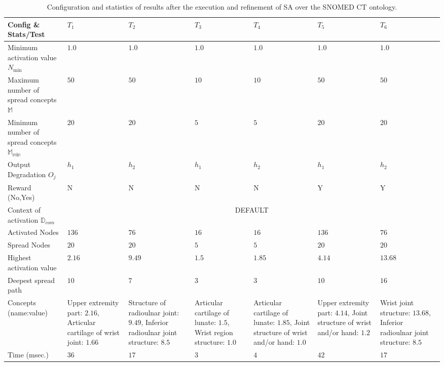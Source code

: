 \begin{table*}[!h]
\renewcommand{\arraystretch}{1.3}
\begin{center}
\begin{tabular}{|p{3cm}|p{1.5cm}|p{1.5cm}|p{1.5cm}|p{1.5cm}|p{1.5cm}|p{1.5cm}|}
\hline
        \textbf{Config \& Stats/Test}&$T_1$&$T_2$&$T_3$&$T_4$&$T_5$&$T_6$\\ \hline
        \hline
        Minimum activation value $N_{\min}$ &$1.0$ &$1.0$ &$1.0$ &$1.0$&$1.0$&$1.0$ \\ \hline
	Maximum number of spread concepts $\mathbb{M}$&$50$ &$50$ &$10$ &$10$&$50$&$50$\\ \hline
	Minimum number of spread concepts $\mathbb{M_{\min}}$&$20$ &$20$ &$5$ &$5$&$20$&$20$  \\ \hline
	Output Degradation $O_j$ & $h_1$ &$h_2$ &$h_1$ &$h_2$&$h_1$&$h_2$\\ \hline
	Reward (No,Yes) &N &N &N &N&Y&Y\\ \hline
	\hline
	Context of activation $\mathbb{D}_{com}$&\multicolumn{6}{|c|}{DEFAULT} \\ \hline
	Activated Nodes &$136$ &$76$ &$16$ &$16$&$136$&$76$ \\ \hline
	Spread Nodes &$20$ &$20$ &$5$ &$5$&$20$&$20$ \\ \hline
	Highest activation value &$2.16$ &$9.49$ &$1.5$ &$1.85$&$4.14$&$13.68$\\ \hline
	Deepest spread path &$10$ &$7$&$3$ &$3$&$10$&$16$\\ \hline
	Concepts (name:value) & Upper extremity part: $2.16$, Articular cartilage of wrist joint: $1.66$ &Structure of radioulnar joint: $9.49$, Inferior radioulnar joint structure: $8.5$ &Articular cartilage of lunate: $1.5$, Wrist region structure: $1.0$ &Articular cartilage of lunate: $1.85$, Joint structure of wrist and/or hand: $1.0$&Upper extremity part: $4.14$, Joint structure of wrist and/or hand: $1.2$&Wrist joint structure: $13.68$, Inferior radioulnar joint structure: $8.5$ \\ \hline
	Time (msec.) & $36$ &$17$ &$3$ &$4$&$42$&$17$ \\ \hline
\end{tabular}
  \caption{Configuration and statistics of results after the execution and refinement of SA over the SNOMED CT ontology.}
  \label{tabla:test-snomed}
  \end{center}
\end{table*} 

